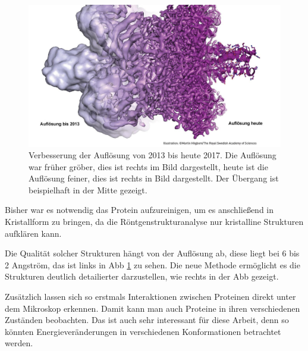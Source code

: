 \begin{figure}
    \centering
    \includegraphics[width=.95\textwidth]{images/Verbesserung_der_Aufloesung.jpg}
    \caption{Verbesserung der Auflösung von 2013 bis heute 2017\protect\footnotemark{}. Die Auflösung war früher gröber, dies ist rechts im Bild dargestellt, heute ist die Auflösung feiner, dies ist rechts in Bild dargestellt. Der Übergang ist beispielhaft in der Mitte gezeigt.}
    \label{fig:verbesserte_aufloesung}
\end{figure}

Bisher war es notwendig das Protein aufzureinigen, um es anschließend in Kristallform zu bringen, da die Röntgenstrukturanalyse nur kristalline Strukturen aufklären kann. 

Die Qualität solcher Strukturen hängt von der Auflösung ab, diese liegt bei 6 bis 2 Angström, das ist links in \ac{Abb} \ref{fig:verbesserte_aufloesung} zu sehen. Die neue Methode ermöglicht es die Strukturen deutlich detailierter darzustellen, wie rechts in der \ac{Abb} gezeigt.

Zusätzlich lassen sich so erstmals Interaktionen zwischen Proteinen direkt unter dem Mikroskop erkennen. Damit kann man auch Proteine in ihren verschiedenen Zuständen beobachten. Das ist auch sehr interessant für diese Arbeit, denn so könnten Energieveränderungen in verschiedenen Konformationen betrachtet werden.




